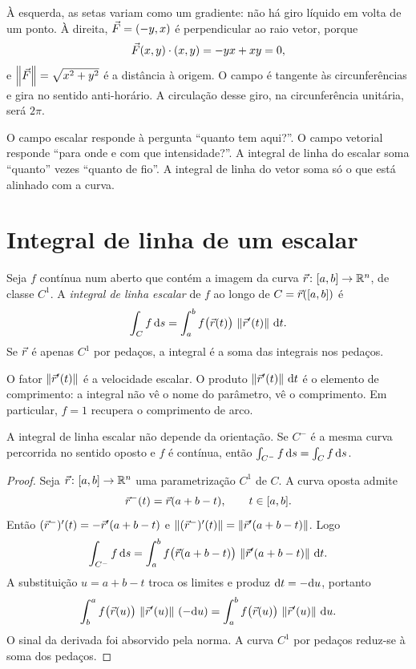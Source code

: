 \documentclass[11pt,a4paper]{article}
\begin{document}
À esquerda, as setas variam como um gradiente: não há giro líquido em volta de um ponto. À direita, $\vec{F}=(-y,x)$ é perpendicular ao raio vetor, porque
\[
\vec{F}(x,y)\cdot(x,y)=-yx+xy=0,
\]
e $\left\lVert \vec{F} \right\rVert=\sqrt{x^2+y^2}$ é a distância à origem. O campo é tangente às circunferências e gira no sentido anti-horário. A circulação desse giro, na circunferência unitária, será $2\pi$.

\begin{intuicao}
O campo escalar responde à pergunta ``quanto tem aqui?''. O campo vetorial responde ``para onde e com que intensidade?''. A integral de linha do escalar soma ``quanto'' vezes ``quanto de fio''. A integral de linha do vetor soma só o que está alinhado com a curva.
\end{intuicao}

\section{Integral de linha de um escalar}

\begin{definicao}
Seja $f$ contínua num aberto que contém a imagem da curva $\vec{r}\colon[a,b]\to\mathbb{R}^n$, de classe $C^1$. A \emph{integral de linha escalar} de $f$ ao longo de $C=\vec{r}([a,b])$ é
\[
\int_C f\,\mathrm{d} s
=\int_a^b f\bigl(\vec{r}(t)\bigr)\,\left\lVert \vec{r}'(t) \right\rVert\,\mathrm{d} t.
\]
Se $\vec{r}$ é apenas $C^1$ por pedaços, a integral é a soma das integrais nos pedaços.
\end{definicao}

O fator $\left\lVert \vec{r}'(t) \right\rVert$ é a velocidade escalar. O produto $\left\lVert \vec{r}'(t) \right\rVert\,\mathrm{d} t$ é o elemento de comprimento: a integral não vê o nome do parâmetro, vê o comprimento. Em particular, $f=1$ recupera o comprimento de arco.

\begin{proposicao}
A integral de linha escalar não depende da orientação. Se $C^{-}$ é a mesma curva percorrida no sentido oposto e $f$ é contínua, então $\int_{C^{-}} f\,\mathrm{d} s=\int_C f\,\mathrm{d} s$.
\end{proposicao}

\begin{proof}
Seja $\vec{r}\colon[a,b]\to\mathbb{R}^n$ uma parametrização $C^1$ de $C$. A curva oposta admite
\[
\vec{r}^{-}(t)=\vec{r}(a+b-t),\qquad t\in[a,b].
\]
Então $(\vec{r}^{-})'(t)=-\vec{r}'(a+b-t)$ e $\left\lVert (\vec{r}^{-})'(t) \right\rVert=\left\lVert \vec{r}'(a+b-t) \right\rVert$. Logo
\[
\int_{C^{-}} f\,\mathrm{d} s
=\int_a^b f\bigl(\vec{r}(a+b-t)\bigr)\,\left\lVert \vec{r}'(a+b-t) \right\rVert\,\mathrm{d} t.
\]
A substituição $u=a+b-t$ troca os limites e produz $\mathrm{d} t=-\mathrm{d} u$, portanto
\[
\int_b^a f\bigl(\vec{r}(u)\bigr)\,\left\lVert \vec{r}'(u) \right\rVert\,(-\mathrm{d} u)
=\int_a^b f\bigl(\vec{r}(u)\bigr)\,\left\lVert \vec{r}'(u) \right\rVert\,\mathrm{d} u.
\]
O sinal da derivada foi absorvido pela norma. A curva $C^1$ por pedaços reduz-se à soma dos pedaços.
\end{proof}
\end{document}
